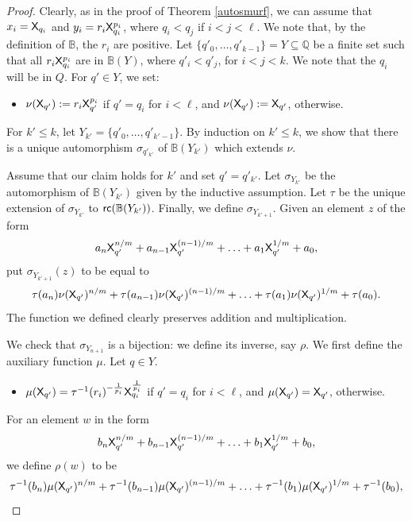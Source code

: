 \documentclass{amsart}
\renewcommand{\leq}{\leqslant}
\newcommand{\X}{{\sf X}}
\newcommand{\QS}{\mathbb{B}}
\newcommand{\rc}{{\sf rc}}
\newcommand{\fsvar}{Y}
\newcommand{\fsvard}{Y}
\begin{document}
\begin{proof}
    Clearly, as in the proof of Theorem \ref{autosmurf}, we can assume that $x_i = \X_{q_{i}}$ and 
    $y_i = r_i\X_{q_i}^{p_i}$, where $q_i<q_j$ if $i<j<\ell $. 
    We note that,
    by the definition of $\QS$, 
    the $r_i$ are positive. Let $\{q'_0,\ldots, q'_{k-1}\} = \fsvard\subseteq \mathbb{Q}$ be a finite set
    such that all $r_i\X_{q_i}^{p_i}$ are in $\mathbb{B}(\fsvard)$, where 
    $q'_i < q'_j$, for $i<j<k$. We note that the $q_i$ will be in $Q$.
    For $q' \in \fsvard$, we set:
    \begin{itemize}
        \item 
    $\nu(\X_{q'}) := r_i \X_{q'}^{p_i}$ if $q'=q_i$ for $i< \ell$, 
    and  $\nu(\X_{q'}) := \X_{q'}$, otherwise.
    \end{itemize}
    
    For $k'\leq k$, 
    let $\fsvard_{k'} = \{q'_0,\ldots, q'_{k'-1}\}$.  By induction on $k'\leq k$, we show that 
    there is a unique automorphism $\sigma_{q'_{k'}}$ of $\mathbb{B}({\fsvard_{k'}})$ which 
    extends $\nu$.
    
    Assume that our claim holds for $k'$ and set $q' = q'_{k'}$. Let $\sigma_{\fsvard_{k'}}$ be the 
    automorphism of $\mathbb{B}({\fsvard_{k'}})$ 
    given by the inductive assumption. Let $\tau$ be the unique extension of $\sigma_{\fsvard_{k'}}$ to 
    $\rc(\mathbb{B}(\fsvard_{k'}))$. Finally, we define $\sigma_{\fsvard_{k'+1}}$. Given an element $z$ of the form
    \[a_n\X_{q'}^{n/m}+a_{n-1}\X_{q'}^{(n-1)/m} + \ldots + a_1 \X_{q'}^{1/m} + a_0,\]
    put $\sigma_{\fsvard_{k'+1}}(z)$ to be equal to
    \[\tau(a_n)\nu(\X_{q'})^{n/m} + \tau(a_{n-1})\nu(\X_{q'})^{(n-1)/m} + 
    \ldots + \tau(a_1)\nu(\X_{q'})^{1/m} + \tau(a_0).\]
        The function we defined clearly preserves addition and multiplication. 
   
    We check that $\sigma_{\fsvar_{n+1}}$ is a bijection: we define its 
    inverse, say $\rho$. We first define the auxiliary function $\mu$. Let $q \in \fsvard$.
    \begin{itemize}
        \item 
    $\mu(\X_{q'}) = \tau^{-1}(r_i)^{-\frac{1}{p_i}}\X_{q_i}^{\frac{1}{p_i}}$ if $q' = q_i$ for $i< \ell$, and
    $\mu(\X_{q'}) = \X_{q'}$, otherwise.
    \end{itemize}
    For an element $w$ in the form
    \[b_n\X_{q'}^{n/m}+b_{n-1}\X_{q'}^{(n-1)/m} + \ldots + b_1 \X_{q'}^{1/m} + b_0,\]
    we define $\rho(w)$ to be {\small
    \[\tau^{-1}(b_n)\mu(\X_{q'})^{n/m} + \tau^{-1}(b_{n-1})\mu(\X_{q'})^{(n-1)/m} + 
    \ldots + \tau^{-1}(b_1)\mu(\X_{q'})^{1/m} + \tau^{-1}(b_0),\]
    }
    

\end{proof}
\end{document}
